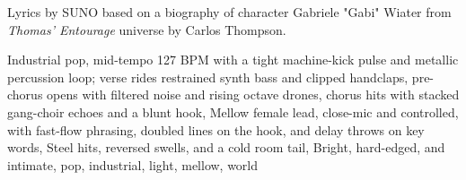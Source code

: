 
\begin{notes}
Lyrics by SUNO based on a biography of character Gabriele "Gabi" Wiater from \emph{Thomas’ Entourage} universe by Carlos Thompson.
\end{notes}
\begin{style}
Industrial pop, mid-tempo 127 BPM with a tight machine-kick pulse and metallic percussion loop; verse rides restrained synth bass and clipped handclaps, pre-chorus opens with filtered noise and rising octave drones, chorus hits with stacked gang-choir echoes and a blunt hook, Mellow female lead, close-mic and controlled, with fast-flow phrasing, doubled lines on the hook, and delay throws on key words, Steel hits, reversed swells, and a cold room tail, Bright, hard-edged, and intimate, pop, industrial, light, mellow, world
\end{style}
